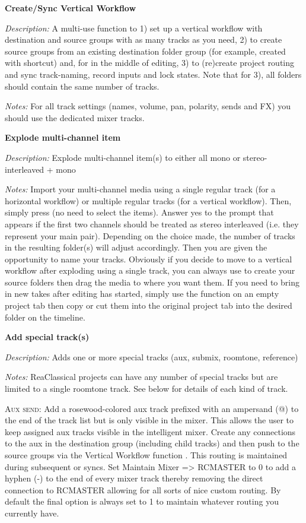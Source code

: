 \documentclass[10pt,american]{article}
\begin{document}
\textbf{Create/Sync Vertical Workflow }

\emph{Description: }A multi-use function to 1) set up a vertical workflow with
destination and source groups with as many tracks as you need, 2) to create
source groups from an existing destination folder group (for example, created
with  shortcut) and, for in the middle of editing, 3) to (re)create
project routing and sync track-naming, record inputs and lock states. Note that
for 3), all folders should contain the same number of tracks.

\emph{Notes: }For all track settings (names, volume, pan, polarity, sends and
FX) you should use the dedicated mixer tracks.

\textbf{Explode multi-channel item }

\emph{Description:} Explode multi-channel item(s) to either all mono or
stereo-interleaved + mono

\emph{Notes:} Import your multi-channel media using a single regular track (for
a horizontal workflow) or multiple regular tracks (for a vertical workflow).
Then, simply press  (no need to select the items). Answer yes to the
prompt that appears if the first two channels should be treated as stereo
interleaved (i.e. they represent your main pair). Depending on the choice made,
the number of tracks in the resulting folder(s) will adjust accordingly. Then
you are given the opportunity to name your tracks. Obviously if you decide to
move to a vertical workflow after exploding using a single track, you can always
use  to create your source folders then drag the media to where you
want them. If you need to bring in new takes after editing has started, simply
use the function on an empty project tab then copy or cut them into the original
project tab into the desired folder on the timeline.

\textbf{Add special track(s) }\keys{\#}

\emph{Description: }Adds one or more special tracks (aux, submix, roomtone,
reference)

\emph{Notes: }ReaClassical projects can have any number of special tracks but
are limited to a single roomtone track. See below for details of each kind of
track.

\textsc{Aux send}: Add a rosewood-colored aux track prefixed with an ampersand
(@) to the end of the track list but is only visible in the mixer. This allows
the user to keep assigned aux tracks visible in the intelligent mixer. Create
any connections to the aux in the destination group (including child tracks) and
then push to the source groups via the Vertical Workflow function  .
This routing is maintained during subsequent  or  syncs. Set
\textquotedbl Maintain Mixer => RCMASTER\textquotedbl{} to 0 to add a hyphen (-)
to the end of every mixer track thereby removing the direct connection to
RCMASTER allowing for all sorts of nice custom routing. By default the final
option is always set to 1 to maintain whatever routing you currently have.
\end{document}
